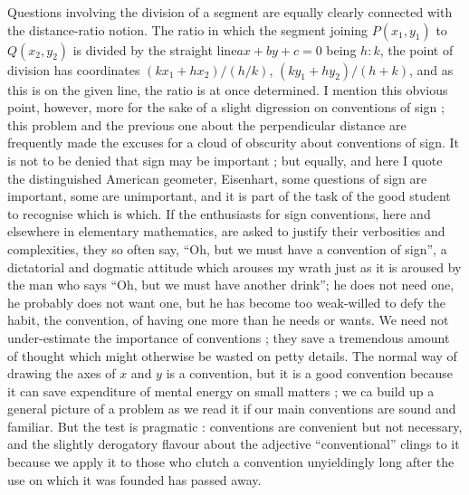 Questions involving the division of a segment are equally clearly
connected with the distance-ratio notion. The ratio in which the
segment joining $P (x_1, y_1)$ to $Q(x_2, y_2)$ is divided by the
straight line\pageoriginale $ax + by + c = 0$ being $h : k$, the point
of division has coordinates $(kx_1 + hx_2) / (h/k)$, $(ky_1 + hy_2)
/(h+k)$, and as this is on the given line, the ratio is at once
determined. I mention this obvious point, however, more for the sake
of a slight digression on conventions of sign ; this problem and the
previous one about the perpendicular distance are frequently made the
excuses for a cloud of obscurity about conventions of sign. It is not
to be denied that sign may be important ; but equally, and here I
quote the distinguished American geometer, Eisenhart, some questions
of sign are important, some are unimportant, and it is part of the
task of the good student to recognise which is which. If the
enthusiasts for sign conventions, here and elsewhere in elementary
mathematics, are asked to justify their verbosities and complexities, 
they so often say, ``Oh, but we must have a convention of sign'', a
dictatorial and dogmatic attitude which arouses my wrath just as it is
aroused by the man who says ``Oh, but we must have another drink''; he
does not need one, he probably does not want one, but he has become
too weak-willed to defy the habit, the convention, of having one more
than he needs or wants. We need not under-estimate the importance of
conventions ; they save a tremendous amount of thought which might
otherwise be wasted on petty details. The normal way of drawing the
axes of $x$ and $y$ is a convention, but it is a good convention
because it can save expenditure of mental energy on small matters ; we
ca build up a general picture of a problem as we read it if our main
conventions are sound and familiar. But the test is pragmatic :
conventions are convenient but not necessary, and the slightly
derogatory flavour about the adjective ``conventional'' clings to it
because we apply it to those who clutch a convention unyieldingly long
after the use on which it was founded has passed away.

